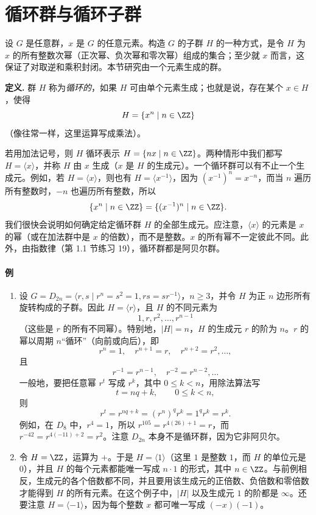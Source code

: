 \section{循环群与循环子群}

设 $G$ 是任意群，$x$ 是 $G$ 的任意元素。构造 $G$ 的子群 $H$ 的一种方式，是令 $H$ 为 $x$ 的所有整数次幂（正次幂、负次幂和零次幂）组成的集合；至少就 $x$ 而言，这保证了对取逆和乘积封闭。本节研究由一个元素生成的群。

\noindent\textbf{定义.} 群 $H$ 称为\emph{循环的}，如果 $H$ 可由单个元素生成；也就是说，存在某个 $x\in H$，使得
\[
  H=\{x^n\mid n\in\ZZ\}
\]
（像往常一样，这里运算写成乘法）。

若用加法记号，则 $H$ 循环表示 $H=\{nx\mid n\in\ZZ\}$。两种情形中我们都写 $H=\langle x\rangle$，并称 $H$ 由 $x$ 生成（$x$ 是 $H$ 的生成元）。一个循环群可以有不止一个生成元。例如，若 $H=\langle x\rangle$，则也有 $H=\langle x^{-1}\rangle$，因为 $(x^{-1})^n=x^{-n}$，而当 $n$ 遍历所有整数时，$-n$ 也遍历所有整数，所以
\[
  \{x^n\mid n\in\ZZ\}=\{(x^{-1})^n\mid n\in\ZZ\}.
\]
我们很快会说明如何确定给定循环群 $H$ 的全部生成元。应注意，$\langle x\rangle$ 的元素是 $x$ 的幂（或在加法群中是 $x$ 的倍数），而不是整数。$x$ 的所有幂不一定彼此不同。此外，由指数律（第 1.1 节练习 19），循环群都是阿贝尔群。

\paragraph{例}
\begin{enumerate}[label=(\arabic*)]
  \item 设 $G=D_{2n}=\langle r,s\mid r^n=s^2=1,
  rs=sr^{-1}\rangle$，$n\geq 3$，并令 $H$ 为正 $n$ 边形所有旋转构成的子群。因此 $H=\langle r\rangle$，且 $H$ 的不同元素为
  \[
    1,r,r^2,\ldots,r^{n-1}
  \]
  （这些是 $r$ 的所有不同幂）。特别地，$|H|=n$，$H$ 的生成元 $r$ 的阶为 $n$。$r$ 的幂以周期 $n$“循环”（向前或向后），即
  \[
    r^n=1,
    \quad r^{n+1}=r,
    \quad r^{n+2}=r^2,\ldots,
  \]
  且
  \[
    r^{-1}=r^{n-1},\quad r^{-2}=r^{n-2},\ldots
  \]
  一般地，要把任意幂 $r^t$ 写成 $r^k$，其中 $0\leq k<n$，用除法算法写
  \[
    t=nq+k,
    \qquad 0\leq k<n,
  \]
  则
  \[
    r^t=r^{nq+k}=(r^n)^q r^k=1^q r^k=r^k.
  \]
  例如，在 $D_8$ 中，$r^4=1$，所以 $r^{105}=r^{4(26)+1}=r$，而 $r^{-42}=r^{4(-11)+2}=r^2$。注意 $D_{2n}$ 本身不是循环群，因为它非阿贝尔。
  \item 令 $H=\ZZ$，运算为 $+$。于是 $H=\langle 1\rangle$（这里 $1$ 是整数 $1$，而 $H$ 的单位元是 $0$），并且 $H$ 的每个元素都能唯一写成 $n\cdot 1$ 的形式，其中 $n\in\ZZ$。与前例相反，生成元的各个倍数都不同，并且要用该生成元的正倍数、负倍数和零倍数才能得到 $H$ 的所有元素。在这个例子中，$|H|$ 以及生成元 $1$ 的阶都是 $\infty$。还要注意 $H=\langle -1\rangle$，因为每个整数 $x$ 都可唯一写成 $(-x)(-1)$。
\end{enumerate}

